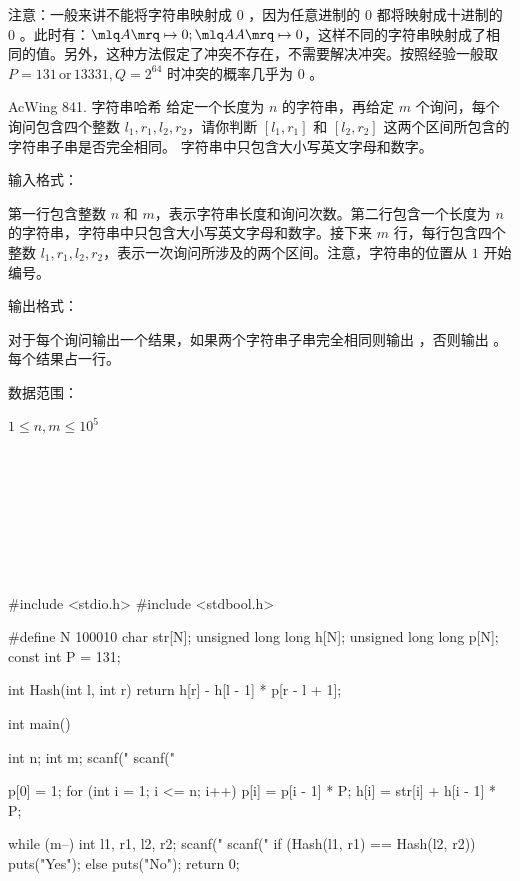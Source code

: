 注意：一般来讲不能将字符串映射成 $0$ ，因为任意进制的 $0$ 都将映射成十进制的 $0$ 。此时有：$\mlq A \mrq \mapsto 0; \mlq AA \mrq \mapsto 0$，这样不同的字符串映射成了相同的值。另外，这种方法假定了冲突不存在，不需要解决冲突。按照经验一般取 $P = 131\, \text{or}\, 13331, Q = 2^{64}$ 时冲突的概率几乎为 $0$ 。

\begin{titledbox}{AcWing 841. 字符串哈希}
    给定一个长度为 $n$ 的字符串，再给定 $m$ 个询问，每个询问包含四个整数 $l_1, r_1, l_2, r_2$，请你判断 $[l_1, r_1]$ 和 $[l_2, r_2]$ 这两个区间所包含的字符串子串是否完全相同。
    字符串中只包含大小写英文字母和数字。

    输入格式：

    第一行包含整数 $n$ 和 $m$，表示字符串长度和询问次数。第二行包含一个长度为 $n$ 的字符串，字符串中只包含大小写英文字母和数字。接下来 $m$ 行，每行包含四个整数 $l_1, r_1, l_2, r_2$，表示一次询问所涉及的两个区间。注意，字符串的位置从 $1$ 开始编号。

    输出格式：

    对于每个询问输出一个结果，如果两个字符串子串完全相同则输出  ，否则输出 。每个结果占一行。

    数据范围：

    $1 \le n, m \le 10^5$

    \begin{inputblock}
         \\
         \\
         \\
         \\
    \end{inputblock}
    \begin{outputblock}
         \\
         \\
    \end{outputblock}
\end{titledbox}

\begin{mycpptwocol}[字符串前缀哈希法]
    #include <stdio.h>
    #include <stdbool.h>

    #define N 100010
    char str[N];
    unsigned long long h[N];
    unsigned long long p[N];
    const int P = 131;

    int Hash(int l, int r) {
        return h[r] - h[l - 1] * p[r - l + 1];
    }

    int main() {
        int n;
        int m;
        scanf("%
        scanf("%

        p[0] = 1;
        for (int i = 1; i <= n; i++) {
            p[i] = p[i - 1] * P;
            h[i] = str[i] + h[i - 1] * P;
        }

        while (m--) {
            int l1, r1, l2, r2;
            scanf("%
            scanf("%
            if (Hash(l1, r1) == Hash(l2, r2)) {
                puts("Yes");
            } else {
                puts("No");
            }
        }
        return 0;
    }
\end{mycpptwocol}

